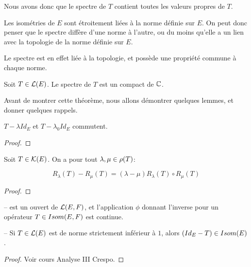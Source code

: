 Nous avons donc que le spectre de $T$ contient toutes les valeurs propres de
$T$.

Les isométries de $E$ sont étroitement liées à la norme définie sur $E$. On peut
donc penser que le spectre diffère d'une norme à l'autre, ou du moins qu'elle a
un lien avec la topologie de la norme définie sur $E$.

Le spectre est en effet liée à la topologie, et possède une propriété commune à
chaque norme.

\begin{theorem}
	\label{thm:spectrum_compact}
	Soit $T \in \mathcal{L}(E)$.
	Le spectre de $T$ est un compact de $\mathbb{C}$.
\end{theorem}

Avant de montrer cette théorème, nous allons démontrer quelques lemmes, et
donner quelques rappels.

\begin{lemma}
	$T - \lambda Id_{E}$ et $T - \lambda_{0} Id_{E}$ commutent.
\end{lemma}

\begin{proof}
	
\end{proof}

\begin{proposition} 
	\label{prop:resolvante_identity}
	Soit $T \in \mathcal{K}(E)$.
	On a pour tout $\lambda, \mu \in \rho(T)$:

	\begin{equation}
		R_{\lambda}(T) - R_{\mu}(T) = (\lambda - \mu) R_{\lambda}(T) \circ
		R_{\mu}(T)
	\end{equation}
\end{proposition}

\begin{proof}

\end{proof}

\begin{proposition}
	--  est un ouvert de $\mathcal{L}(E, F)$, et
	l'application $\phi$ donnant l'inverse pour un opérateur $T \in
	Isom(E, F)$ est continue.

	-- Si $T \in \mathcal{L}(E)$ est de norme strictement inférieur à $1$,
	alors $(Id_{E} - T) \in Isom(E)$.
\end{proposition}

\begin{proof}
	Voir cours Analyse III Crespo.
\end{proof}


